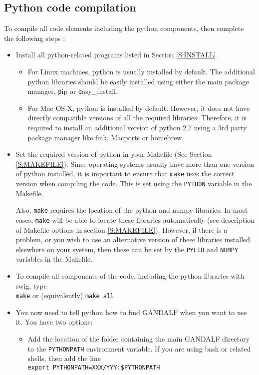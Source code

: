 \documentclass[a4paper]{article}
\newcommand{\var}[1]{\texttt{#1}}
\begin{document}
\subsection{Python code compilation}
To compile all code elements including the python components, then complete the following steps :
\begin{itemize}

\item Install all python-related programs listed in Section \ref{S:INSTALL}

\begin{itemize}
\item For Linux machines, python is usually installed by default.  The additional python libraries should be easily installed using either the main package manager,  {\var pip} or {\var easy\_install}.
\item For Mac OS X, python is installed by default.  However, it does not have directly compatible versions of all the required libraries.  Therefore, it is required to install an additional version of python 2.7 using a 3rd party package manager like fink, Macports or homebrew.
\end{itemize}

\item Set the required version of python in your Makefile (See Section \ref{S:MAKEFILE}).  Since operating systems usually have more than one version of python installed, it is important to ensure that \var{make} uses the correct version when compiling the code.  This is set using the \var{PYTHON} variable in the Makefile.

Also, \var{make} requires the location of the python and numpy libraries.  In most cases, \var{make} will be able to locate these libraries automatically (see description of Makefile options in section \ref{S:MAKEFILE}).  However, if there is a problem, or you wish to use an alternative version of these libraries installed elsewhere on your system, then these can be set by the \var{PYLIB} and \var{NUMPY} variables in the Makefile.


\item To compile all components of the code, including the python libraries with swig, type \\
\newline
\noindent \var{make} or (equivalently) \var{make all}\\

\item You now need to tell python how to find GANDALF when you want to use it. You have two options:
\begin{itemize}
\item Add the location of the folder containing the main GANDALF directory to the \var{PYTHONPATH} environment variable.  If you are using bash or related shells, then add the line \\
\newline
\noindent \var{export PYTHONPATH=XXX/YYY:\$PYTHONPATH} \\


\end{itemize}
\end{itemize}
\end{document}
